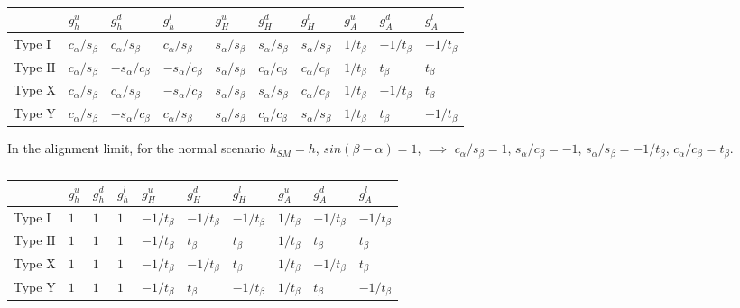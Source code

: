 \begin{table}[H]
    \centering
    \begin{tabular}{p{1.5cm}|x{1.2cm}x{1.2cm}x{1.2cm}x{1.2cm}x{1.2cm}x{1.2cm}x{1.2cm}x{1.2cm}x{1.2cm}}
         \hline
          & $g_{h}^{u}$ & $g_{h}^{d}$ & $g_{h}^{l}$ & $g_{H}^{u}$ & $g_{H}^{d}$ & $g_{H}^{l}$ & $g_{A}^{u}$ & $g_{A}^{d}$ & $g_{A}^{l}$ \\
         \hline
         \hline
         Type I & $c_{\alpha}/s_{\beta}$ & $c_{\alpha}/s_{\beta}$ & $c_{\alpha}/s_{\beta}$ & $s_{\alpha}/s_{\beta}$ & $s_{\alpha}/s_{\beta}$ & $s_{\alpha}/s_{\beta}$ & $1/t_{\beta}$ & $-1/t_{\beta}$ & $-1/t_{\beta}$ \\
         Type II & $c_{\alpha}/s_{\beta}$ & $-s_{\alpha}/c_{\beta}$ & $-s_{\alpha}/c_{\beta}$ & $s_{\alpha}/s_{\beta}$ & $c_{\alpha}/c_{\beta}$ & $c_{\alpha}/c_{\beta}$ & $1/t_{\beta}$ & $t_{\beta}$ & $t_{\beta}$ \\
         Type X & $c_{\alpha}/s_{\beta}$ & $c_{\alpha}/s_{\beta}$ & $-s_{\alpha}/c_{\beta}$ & $s_{\alpha}/s_{\beta}$ & $s_{\alpha}/s_{\beta}$ & $c_{\alpha}/c_{\beta}$ & $1/t_{\beta}$ & $-1/t_{\beta}$ & $t_{\beta}$ \\
         Type Y & $c_{\alpha}/s_{\beta}$ & $-s_{\alpha}/c_{\beta}$ & $c_{\alpha}/s_{\beta}$ & $s_{\alpha}/s_{\beta}$ & $c_{\alpha}/c_{\beta}$ & $s_{\alpha}/s_{\beta}$ & $1/t_{\beta}$ & $t_{\beta}$ & $-1/t_{\beta}$ \\
         \hline
    \end{tabular}
    \caption{}
\end{table}

In the alignment limit, for the normal scenario $h_{SM}=h$, $sin(\beta-\alpha)=1$, $\implies$ $c_{\alpha}/s_{\beta}=1$, $s_{\alpha}/c_{\beta}=-1$, $s_{\alpha}/s_{\beta}=-1/t_{\beta}$, $c_{\alpha}/c_{\beta}=t_{\beta}$.

\begin{table}[H]
    \centering
    \begin{tabular}{p{1.5cm}|x{1.2cm}x{1.2cm}x{1.2cm}x{1.2cm}x{1.2cm}x{1.2cm}x{1.2cm}x{1.2cm}x{1.2cm}}
         \hline
          & $g_{h}^{u}$ & $g_{h}^{d}$ & $g_{h}^{l}$ & $g_{H}^{u}$ & $g_{H}^{d}$ & $g_{H}^{l}$ & $g_{A}^{u}$ & $g_{A}^{d}$ & $g_{A}^{l}$ \\
         \hline
         \hline
         Type I & $1$ & $1$ & $1$ & $-1/t_{\beta}$ & $-1/t_{\beta}$ & $-1/t_{\beta}$ & $1/t_{\beta}$ & $-1/t_{\beta}$ & $-1/t_{\beta}$ \\
         Type II & $1$ & $1$ & $1$ & $-1/t_{\beta}$ & $t_{\beta}$ & $t_{\beta}$ & $1/t_{\beta}$ & $t_{\beta}$ & $t_{\beta}$ \\
         Type X & $1$ & $1$ & $1$ & $-1/t_{\beta}$ & $-1/t_{\beta}$ & $t_{\beta}$ & $1/t_{\beta}$ & $-1/t_{\beta}$ & $t_{\beta}$ \\
         Type Y & $1$ & $1$ & $1$ & $-1/t_{\beta}$ & $t_{\beta}$ & $-1/t_{\beta}$ & $1/t_{\beta}$ & $t_{\beta}$ & $-1/t_{\beta}$ \\
         \hline
    \end{tabular}
    \caption{}
\end{table}


